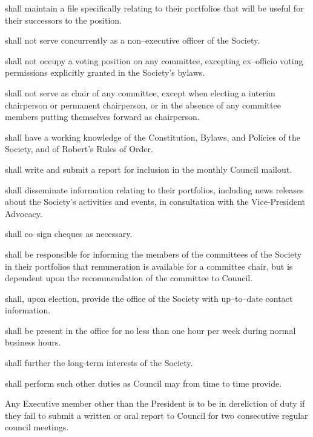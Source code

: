 \begin{longenum}[ label*=\thesubsection.\arabic*., align=left]
    \item shall maintain a file specifically relating to their portfolios that will be useful for their successors to the position.
    \item shall not serve concurrently as a non--executive officer of the Society.
    \item shall not occupy a voting position on any committee, excepting ex--officio voting permissions explicitly granted in the Society's bylaws.
    \begin{longenum}[ label*=\arabic*., align=left]
		\item shall not serve as chair of any committee, except when electing a interim chairperson or permanent chairperson, or in the absence of any committee members putting themselves forward as chairperson. 
   	\end{longenum}
    \item shall have a working knowledge of the Constitution, Bylaws, and Policies of the Society, and of Robert's Rules of Order.
    \item shall write and submit a report for inclusion in the monthly Council mailout.
    \item shall disseminate information relating to their portfolios, including news releases about the Society's activities and events, in consultation with the Vice-President Advocacy.
    \item shall co--sign cheques as necessary.  
    \item shall be responsible for informing the members of the committees of the Society in their portfolios that remuneration is available for a committee chair, but is dependent upon the recommendation of the committee to Council.
    \item shall, upon election, provide the office of the Society with up--to--date contact information. 
    \item shall be present in the office for no less than one hour per week during normal business hours.
    \item shall further the long-term interests of the Society.
    \item shall perform such other duties as Council may from time to time provide.
    \item Any Executive member other than the President is to be in dereliction of duty if they fail to submit a written or oral report to Council for two consecutive regular council meetings.
\end{longenum}
